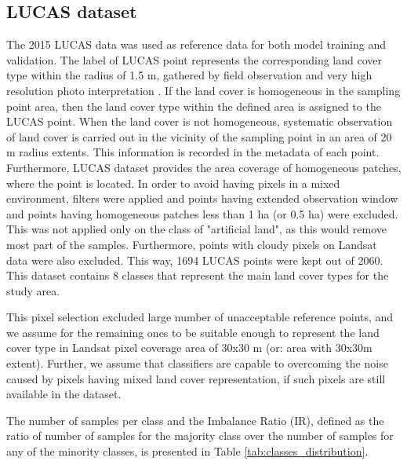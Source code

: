 \documentclass[remotesensing,article,submit,moreauthors,pdftex]{Definitions/mdpi}
\begin{document}
\subsection{LUCAS dataset}

The 2015 LUCAS data was used as reference data for both model training and
validation. The label of LUCAS point represents the corresponding land cover
type within the radius of 1.5 m, gathered  by field observation and very high
resolution photo interpretation  \cite{LUCAS2015C1}. If the land cover is 
homogeneous in the sampling point area, then the land cover type within the 
defined area is assigned to the LUCAS point. When the land cover is not 
homogeneous, systematic observation of land cover is carried out  in the
vicinity of the sampling point in an area of 20 m radius extents. This
information is recorded in the metadata of each point. Furthermore, LUCAS
dataset provides the area coverage of homogeneous patches, where the point is
located. In order to avoid having pixels in a mixed environment, filters were
applied and points having extended observation window and points having
homogeneous patches less than 1 ha (or 0.5 ha)  were excluded. This was not
applied only on the class of "artificial land", as this would remove most part
of the samples. Furthermore, points with cloudy pixels on Landsat data were also
excluded. This way, 1694 LUCAS points were kept out of 2060. This dataset
contains 8 classes that represent the main land cover types for the study area.

This pixel selection excluded large number of unacceptable reference points, and
we assume for the remaining ones to be suitable enough to represent the land
cover type in Landsat pixel coverage area of 30x30 m (or: area with 30x30m 
extent). Further, we assume that classifiers are capable to overcoming the 
noise caused by pixels having mixed land cover representation, if such pixels 
are still available in the dataset.

The number of samples per class and the Imbalance Ratio (IR), defined as the
ratio of number of samples for the majority class over the number of samples for
any of the minority classes, is presented in Table
\ref{tab:classes_distribution}.
\end{document}
